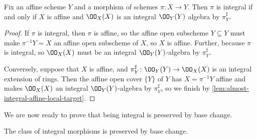 \documentclass[../notes.tex]{subfiles}
\begin{document}
\begin{corollary} \label{cor:affine-integral-condition}
	Fix an affine scheme $Y$ and a morphism of schemes $\pi\colon X\to Y$. Then $\pi$ is integral if and only if $X$ is affine and $\OO_X(X)$ is an integral $\OO_Y(Y)$ algebra by $\pi^\sharp_Y$.
\end{corollary}
\begin{proof}
	If $\pi$ is integral, then $\pi$ is affine, so the affine open subscheme $Y\subseteq Y$ must make $\pi^{-1}Y=X$ an affine open subscheme of $X$, so $X$ is affine. Further, because $\pi$ is integral, so $\OO_X(X)$ must be an integral $\OO_Y(Y)$-algebra by $\pi^\sharp_Y$.

	Conversely, suppose that $X$ is affine, and $\pi^\sharp_Y\colon\OO_Y(Y)\to\OO_X(X)$ is an integral extension of rings. Then the affine open cover $\{Y\}$ of $Y$ has $X=\pi^{-1}Y$ affine and makes $\OO_X(X)$ an integral $\OO_Y(Y)$-algebra by $\pi^\sharp_V$, so we finish by \autoref{lem:almost-integral-affine-local-target}.
\end{proof}
We are now ready to prove that being integral is preserved by base change.
\begin{lemma}
	The class of integral morphisms is preserved by base change.
\end{lemma}
\end{document}
